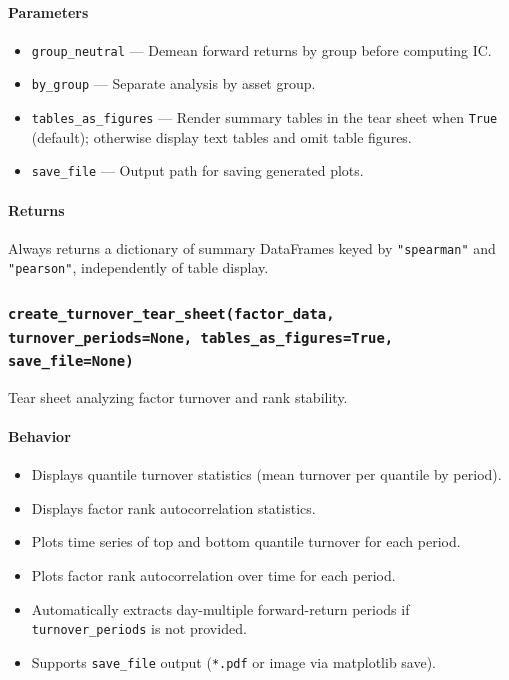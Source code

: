 \documentclass[11pt]{article}
\begin{document}
\paragraph{Parameters}
\begin{itemize}
  \item \texttt{group\_neutral} --- Demean forward returns by group before computing IC.
  \item \texttt{by\_group} --- Separate analysis by asset group.
  \item \texttt{tables\_as\_figures} --- Render summary tables in the tear sheet when \texttt{True} (default); otherwise display text tables and omit table figures.
  \item \texttt{save\_file} --- Output path for saving generated plots.
\end{itemize}

\paragraph{Returns}
Always returns a dictionary of summary DataFrames keyed by \texttt{"spearman"} and \texttt{"pearson"}, independently of table display.

\subsubsection{\texttt{create\_turnover\_tear\_sheet(factor\_data, turnover\_periods=None, tables\_as\_figures=True, save\_file=None)}}
Tear sheet analyzing factor turnover and rank stability.

\paragraph{Behavior}
\begin{itemize}
  \item Displays quantile turnover statistics (mean turnover per quantile by period).
  \item Displays factor rank autocorrelation statistics.
  \item Plots time series of top and bottom quantile turnover for each period.
  \item Plots factor rank autocorrelation over time for each period.
  \item Automatically extracts day-multiple forward-return periods if \texttt{turnover\_periods} is not provided.
  \item Supports \texttt{save\_file} output (\texttt{*.pdf} or image via matplotlib save).
\end{itemize}
\end{document}
